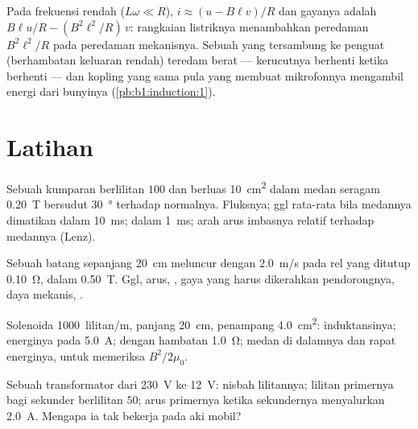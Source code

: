 \begin{remark}\label{rem:b1:induction:damping}
Pada frekuensi rendah ($L\omega \ll R$), $i \approx (u - B\ell v)/R$ dan gayanya
adalah $B\ell u/R - (B^2\ell^2/R)\,v$: rangkaian listriknya menambahkan peredaman
$B^2\ell^2/R$ pada peredaman mekanisnya. Sebuah  yang tersambung ke
penguat (berhambatan keluaran rendah) teredam berat --- kerucutnya berhenti
ketika  berhenti --- dan kopling yang sama pula yang membuat
mikrofonnya mengambil energi dari bunyinya (\cref{pb:b1:induction:1}).
\end{remark}

\section{Latihan}

\begin{exercise}[$\star$]\label{exo:b1:induction:1}
Sebuah kumparan berlilitan $100$ dan berluas \qty{10}{cm^2} dalam medan seragam \qty{0.20}{T} bersudut
\qty{30}{\degree} terhadap normalnya. Fluksnya; ggl rata-rata bila medannya dimatikan
dalam \qty{10}{ms}; dalam \qty{1}{ms}; arah arus imbasnya
relatif terhadap medannya (Lenz).
\end{exercise}

\begin{exercise}[$\star$]\label{exo:b1:induction:2}
Sebuah batang sepanjang \qty{20}{cm} meluncur dengan \qty{2.0}{m/s} pada rel yang ditutup
\qty{0.10}{\ohm}, dalam \qty{0.50}{T}. Ggl, arus, , gaya yang harus
dikerahkan pendorongnya, daya mekanis, .
\end{exercise}

\begin{exercise}[$\star$]\label{exo:b1:induction:3}
Solenoida \qty{1000}{lilitan/m}, panjang \qty{20}{cm}, penampang \qty{4.0}{cm^2}:
induktansinya; energinya pada \qty{5.0}{A};  dengan hambatan
\qty{1.0}{\ohm}; medan di dalamnya dan rapat energinya, untuk memeriksa $B^2/2\mu_0$.
\end{exercise}

\begin{exercise}[$\star$]\label{exo:b1:induction:4}
Sebuah transformator dari \qty{230}{V} ke \qty{12}{V}: nisbah lilitannya; lilitan
primernya bagi sekunder berlilitan $50$; arus primernya ketika sekundernya
menyalurkan \qty{2.0}{A}. Mengapa ia tak bekerja pada aki mobil?
\end{exercise}

